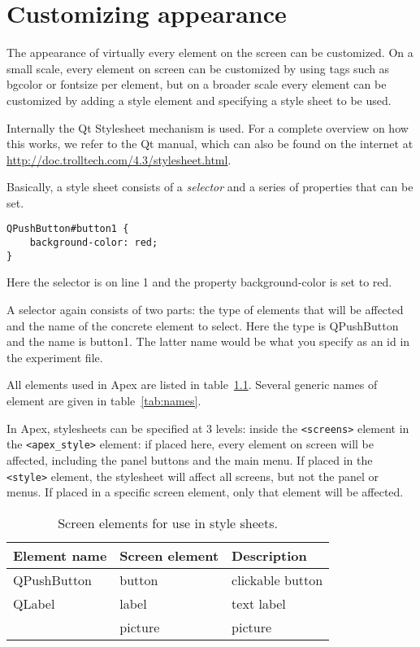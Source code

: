 \chapter{Customizing appearance}
\label{sec:Customizing appearance}

The appearance of virtually every element on the screen can be
customized. On a small scale, every element on screen can be
customized by using tags such as bgcolor or fontsize per element,
but on a broader scale every element can be customized by adding a
style element and specifying a style sheet to be used.

Internally the Qt Stylesheet mechanism is used. For a complete overview on how this works, we refer to the Qt manual, which can also be found on the internet at \url{http://doc.trolltech.com/4.3/stylesheet.html}.

Basically, a style sheet consists of a \emph{selector} and a series of properties that can be set.

\begin{lstlisting}
QPushButton#button1 {
    background-color: red;
}
\end{lstlisting}


Here the selector is on line  1 and the property background-color is set to red.

A selector again consists of two parts: the type of elements that will be affected and the name of the concrete element to select. Here the type is QPushButton and the name is button1. The latter name would be what you specify as an id in the experiment file.

All elements used in Apex are listed in table~\ref{tab:elements}. Several generic names of element are given in table~\ref{tab:names}.

In Apex, stylesheets can be specified at 3 levels: inside the \lstinline!<screens>! element in the \lstinline!<apex_style>! element: if placed here, every element on screen will be affected, including the panel buttons and the main menu. If placed in the \lstinline!<style>! element, the stylesheet will affect all screens, but not the panel or menus. If placed in a specific screen element, only that element will be affected.

\begin{table}
\begin{center}
\begin{tabular}{lll}        \toprule
Element name & Screen element & Description \\      \midrule
QPushButton & button & clickable button \\
QLabel & label & text label \\
& picture & picture  \\
\bottomrule
\end{tabular}
\end{center}
\caption{Screen elements for use in style sheets.}
\label{tab:elements}
\end{table}


